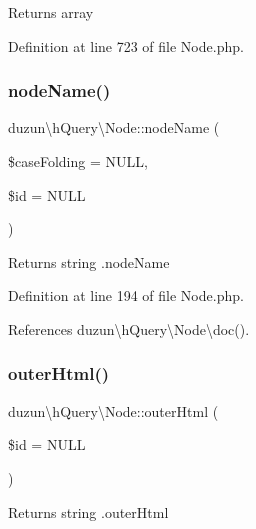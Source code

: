 \begin{DoxyReturn}{Returns}
array 
\end{DoxyReturn}


Definition at line 723 of file Node.\+php.

\mbox{\label{classduzun_1_1hQuery_1_1Node_a82cc8fc0d4acd22bb0cd3fd50389f32d}} 
\subsubsection{\texorpdfstring{node\+Name()}{nodeName()}}
{\footnotesize\ttfamily duzun\textbackslash{}h\+Query\textbackslash{}\+Node\+::node\+Name (\begin{DoxyParamCaption}\item[{}]{\$case\+Folding = {\ttfamily NULL},  }\item[{}]{\$id = {\ttfamily NULL} }\end{DoxyParamCaption})}

\begin{DoxyReturn}{Returns}
string .node\+Name 
\end{DoxyReturn}


Definition at line 194 of file Node.\+php.



References duzun\textbackslash{}h\+Query\textbackslash{}\+Node\textbackslash{}doc().

\mbox{\label{classduzun_1_1hQuery_1_1Node_ab3fb9d5a73f184da3a2a70d7ef73827c}} 
\subsubsection{\texorpdfstring{outer\+Html()}{outerHtml()}}
{\footnotesize\ttfamily duzun\textbackslash{}h\+Query\textbackslash{}\+Node\+::outer\+Html (\begin{DoxyParamCaption}\item[{}]{\$id = {\ttfamily NULL} }\end{DoxyParamCaption})}

\begin{DoxyReturn}{Returns}
string .outer\+Html 
\end{DoxyReturn}


